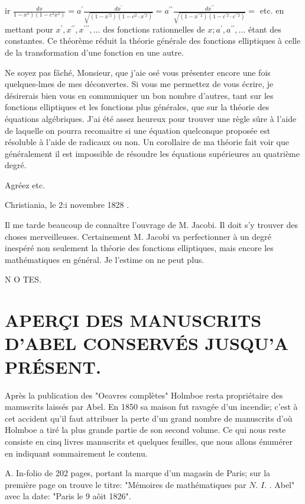 \documentclass{article}
\begin{document}
ir \(\frac{d x}{\left.1-x^{2}\right)\left(1-c^{2} x^{2}\right)}=a^{\prime} \frac{d x^{\prime}}{\sqrt{\left(1-x^{\prime 2}\right)\left(1-c^{2} \cdot x^{\prime 2}\right)}}=a^{\prime \prime} \frac{d x^{\prime \prime}}{\sqrt{\left(1-x^{\prime \prime 2}\right)\left(1-c^{\prime 2} \cdot c^{\prime \prime 2}\right)}}=\) etc. en mettant pour \(x^{\prime}, x^{\prime \prime}, x^{\prime \prime \prime}, \ldots\) des fonctions rationnelles de \(x ; a^{\prime}, a^{\prime \prime}, \ldots\) étant des constantes. Ce théorème réduit la théorie générale des fonctions elliptiques à celle de la transformation d'une fonction en une autre.

Ne soyez pas fâché, Monsieur, que j'aie osé vous présenter encore une fois quelques-lmes de mes déconvertes. Si vous me permettez de vous écrire, je désirerais bien vous en communiquer un bon nombre d'autres, tant sur les fonctions elliptiques et les fonctions plus générales, que sur la théorie des équations algébriques. J'ai été assez heureux pour trouver une règle sûre à l'aide de laquelle on pourra recomaitre si une équation quelconque proposée est résoluble à l'aide de radicaux ou non. Un corollaire de ma théorie fait voir que généralement il est impossible de résoudre les équations supérieures au quatrième degré.

Agréez etc.

Christiania, le 2:i novembre 1828 .

Il me tarde beaucoup de connaître l'ouvrage de M. Jacobi. Il doit s'y trouver des choses merveilleuses. Certainement M. Jacobi va perfectionner à un degré inespéré non seulement la théorie des fonctions elliptiques, mais encore les mathématiques en général. Je l'estime on ne peut plus.

N O TES.

\section*{APERÇI DES MANUSCRITS D'ABEL CONSERVÉS JUSQU'A PRÉSENT.}

Après la publication des "Oeavres complètes" Holmboe resta propriétaire des manuscrits laissés par Abel. En 1850 sa maison fut ravagée d'un incendie; c'est à cet accident qu'il faut attribuer la perte d'un grand nombre de manuscrits d'où Holmboe a tiré la plus grande partie de son second volume. Ce qui nous reste consiste en cinq livres manuscrits et quelques feuilles, que nous allons énumérer en indiquant sommairement le contenu.

A. In-folio de 202 pages, portant la marque d'un magasin de Paris; sur la première page on trouve le titre: "Mémoires de mathématiques par \(N\). \(I\). . Abel" avec la date: "Paris le 9 aôit 1826".
\end{document}

